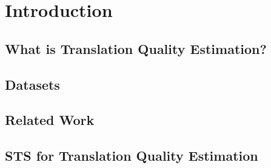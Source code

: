 \chapter{\label{cha:introduction}Introduction}

\section{What is Translation Quality Estimation?}

\section{Datasets}

\section{Related Work}
\cite{kepler-etal-2019-openkiwi}
\section{STS for Translation Quality Estimation}

